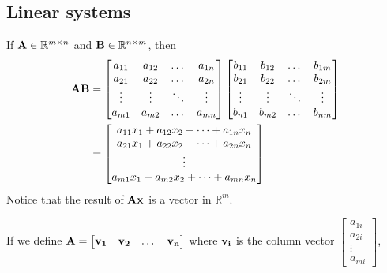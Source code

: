 \documentclass[../main.tex]{subfiles}
\begin{document}
\subsection{Linear systems}

\begin{definition}
	If $\mathbf{A} \in \mathbb{R}^{m\times n}$ and $\mathbf{B} \in \mathbb{R}^{n\times m}$, then
	\begin{align*}
		\mathbf{A}\mathbf{B} & =
		\begin{bmatrix}
			a_{11} & a_{12} & \dots  & a_{1n} \\
			a_{21} & a_{22} & \dots  & a_{2n} \\
			\vdots & \vdots & \ddots & \vdots \\
			a_{m1} & a_{m2} & \dots  & a_{mn}
		\end{bmatrix}
		\begin{bmatrix}
			b_{11} & b_{12} & \dots  & b_{1m} \\
			b_{21} & b_{22} & \dots  & b_{2m} \\
			\vdots & \vdots & \ddots & \vdots \\
			b_{n1} & b_{m2} & \dots  & b_{nm}
		\end{bmatrix}                        \\
		                 & =\begin{bmatrix}
			                    a_{11}x_1+a_{12}x_2+\dots +a_{1n}x_n \\
			                    a_{21}x_1+a_{22}x_2+\dots +a_{2n}x_n \\
			                    \vdots                               \\
			                    a_{m1}x_1+a_{m2}x_2+\dots +a_{mn}x_n \\
		                    \end{bmatrix}
	\end{align*}
	Notice that the result of $\mathbf{A}\mathbf{x}$ is a vector in $\mathbb{R}^m$.
\end{definition}
If we define $\mathbf{A}=\begin{bmatrix}\mathbf{v_1}&\mathbf{v_2}&\dots&\mathbf{v_n}\end{bmatrix}$ where $\mathbf{v_i}$
is the column vector $\begin{bmatrix}a_{1i}\\a_{2i}\\\vdots\\a_{mi}\end{bmatrix}$,
\end{document}
